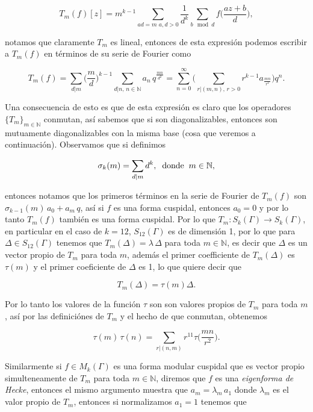 \documentclass[letterpaper]{report}
\newcommand{\nat}{\ensuremath{ \mathbb N }}
\newcommand{\ga}{\ensuremath{\Gamma}}
\newcommand{\modk}{\ensuremath{M_k(\Gamma)}}
\begin{document}
\begin{equation}
T_m(f)[z]=m^{k-1}\sum_{ad=m\,\, a,d>0}\frac{1}{d^k}\sum_{b \mod d}f\Big(\frac{az+b}{d}\Big),
\end{equation} 

\noindent notamos que claramente $T_m$ es lineal, entonces de esta expresión podemos escribir a $T_m(f)$ en términos de su serie de Fourier como

\begin{equation}
T_m(f)=\sum_{d\vert m}\Big(\frac{m}{d}\Big)^{k-1}\sum_{d\vert n,\,n\in\nat}a_n\,q^{\frac{mn}{d^2}}
=\sum_{n=0}^{\infty}\Big(\sum_{r\vert(m,n),\,r>0}r^{k-1}a_{\frac{mn}{r^2}}\Big)q^n.
\end{equation}

Una consecuencia de esto es que de esta expresión es claro que los operadores $\lbrace T_m\rbrace_{m\in\nat}$ conmutan, así sabemos que si son diagonalizables, entonces son mutuamente diagonalizables con la misma base (cosa que veremos a continuación). Observamos que si definimos 

\begin{equation}\label{sigma}
\sigma_{k}(m)=\sum_{d\vert m}d^k,\hspace{0.2cm}\textrm{donde}\hspace{0.2cm}m\in\nat,
\end{equation}

\noindent entonces notamos que los primeros términos en la serie de Fourier de $T_m(f)$ son $\sigma_{k-1}(m)\,a_0+a_m\,q$, así si $f$ es una forma cuspidal, entonces $a_0=0$ y por lo tanto $T_m(f)$ también es una forma cuspidal. Por lo que $T_m:S_k(\ga)\rightarrow S_k(\ga)$, en particular en el caso de $k=12$, $S_{12}(\ga)$ es de dimensión 1, por lo que para $\Delta\in S_{12}(\ga)$ tenemos que $T_m(\Delta)=\lambda\,\Delta$ para toda $m\in\nat$, es decir que $\Delta$ es un vector propio de $T_m$ para toda $m$, además el primer coefficiente de $T_m(\Delta)$ es $\tau(m)$ y el primer coeficiente de $\Delta$ es 1, lo que quiere decir que

$$T_m(\Delta)=\tau(m)\Delta.$$

\noindent Por lo tanto los valores de la función $\tau$ son son valores propios de $T_m$ para toda $m$, así por las definiciónes de $T_m$ y el hecho de que conmutan, obtenemos

$$\tau(m)\,\tau(n) = \sum_{r\vert(n,m)}r^{11}\tau\Big(\frac{mn}{r^2}\Big).$$

Similarmente si $f\in\modk$ es una forma modular cuspidal que es vector propio simulteneamente de $T_m$ para toda $m\in\nat$, diremos que $f$ es una \textit{eigenforma de Hecke}, entonces el mismo argumento muestra que $a_m=\lambda_m\,a_1$ donde $\lambda_m$ es el valor propio de $T_m$, entonces si normalizamos $a_1 = 1$ tenemos que
\end{document}
